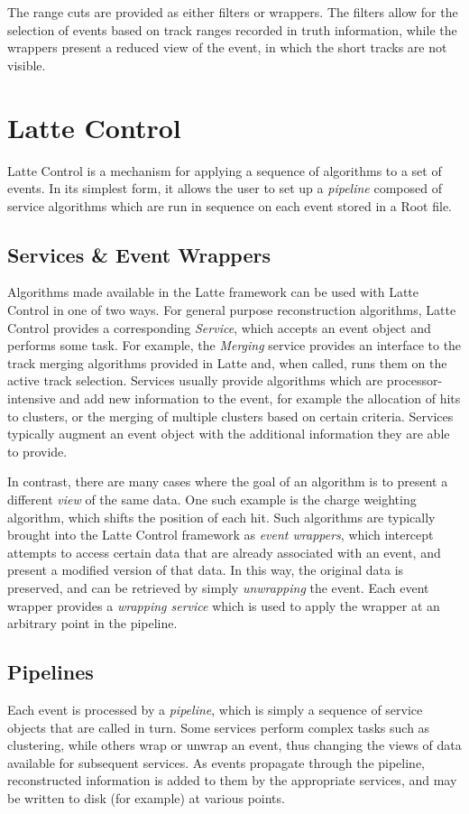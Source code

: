 The range cuts are provided as either filters or wrappers. The filters allow for the selection of events based on track ranges recorded in truth information, while the wrappers present a reduced view of the event, in which the short tracks are not visible.

\section{Latte Control}
Latte Control is a mechanism for applying a sequence of algorithms to a set of events. In its simplest form, it allows the user to set up a \emph{pipeline} composed of service algorithms which are run in sequence on each event stored in a {\sc Root} file.

\subsection{Services \& Event Wrappers}
Algorithms made available in the Latte framework can be used with Latte Control in one of two ways. For general purpose reconstruction algorithms, Latte Control provides a corresponding \emph{Service}, which accepts an event object and performs some task. For example, the \emph{Merging} service provides an interface to the track merging algorithms provided in Latte and, when called, runs them on the active track selection. Services usually provide algorithms which are processor-intensive and add new information to the event, for example the allocation of hits to clusters, or the merging of multiple clusters based on certain criteria. Services typically augment an event object with the additional information they are able to provide.

In contrast, there are many cases where the goal of an algorithm is to present a different \emph{view} of the same data. One such example is the charge weighting algorithm, which shifts the position of each hit. Such algorithms are typically brought into the Latte Control framework as \emph{event wrappers}, which intercept attempts to access certain data that are already associated with an event, and present a modified version of that data. In this way, the original data is preserved, and can be retrieved by simply \emph{unwrapping} the event. Each event wrapper provides a \emph{wrapping service} which is used to apply the wrapper at an arbitrary point in the pipeline.

\subsection{Pipelines}
Each event is processed by a \emph{pipeline}, which is simply a sequence of service objects that are called in turn. Some services perform complex tasks such as clustering, while others wrap or unwrap an event, thus changing the views of data available for subsequent services. As events propagate through the pipeline, reconstructed information is added to them by the appropriate services, and may be written to disk (for example) at various points.

